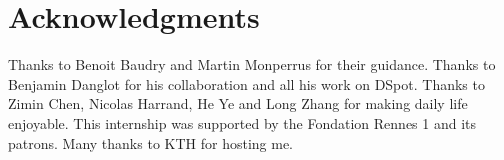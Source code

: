 \documentclass[11pt]{sdm_internship}
\newcommand{\dspot}{DSpot\xspace}
\theoremstyle{definition}
\begin{document}
\section*{Acknowledgments}%
\label{sec:ack}%
Thanks to Benoit Baudry and Martin Monperrus for their guidance.
Thanks to Benjamin Danglot for his collaboration and all his work on \dspot.
Thanks to Zimin Chen, Nicolas Harrand, He Ye and Long Zhang for making daily life enjoyable.
This internship was supported by the Fondation Rennes 1 and its patrons.
Many thanks to KTH for hosting me.


%

\end{document}
